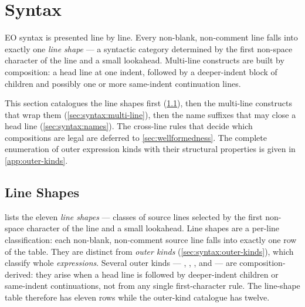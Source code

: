 
\section{Syntax}\label{sec:syntax}

EO syntax is presented line by line.
Every non-blank, non-comment line falls into exactly one \emph{line shape}
  --- a syntactic category determined by the first non-space character of
  the line and a small lookahead.
Multi-line constructs are built by composition:
  a head line at one indent, followed by a deeper-indent block of children
  and possibly one or more same-indent continuation lines.

This section catalogues the line shapes first (\cref{sec:syntax:lines}),
  then the multi-line constructs that wrap them (\cref{sec:syntax:multi-line}),
  then the name suffixes that may close a head line (\cref{sec:syntax:names}).
The cross-line rules that decide which compositions are legal are deferred
  to \cref{sec:wellformedness}.
The complete enumeration of outer expression kinds with their structural
  properties is given in \cref{app:outer-kinds}.

\subsection{Line Shapes}\label{sec:syntax:lines}

 lists the eleven \emph{line shapes} ---
  classes of source lines selected by the first non-space character of
  the line and a small lookahead.
Line shapes are a per-line classification: each non-blank, non-comment
  source line falls into exactly one row of the table.
They are distinct from \emph{outer kinds} (\cref{sec:syntax:outer-kinds}),
  which classify whole \emph{expressions}.
Several outer kinds --- , ,
  , and  ---
  are composition-derived: they arise when a head line is followed by
  deeper-indent children or same-indent  continuations,
  not from any single first-character rule.
The line-shape table therefore has eleven rows while the outer-kind
  catalogue has twelve.

